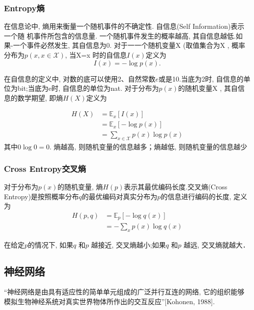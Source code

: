 \documentclass[a4paper]{article}
\begin{document}
\subsubsection{Entropy熵}
在信息论中, 熵用来衡量一个随机事件的不确定性.
 自信息(Self Information)表示一个随 机事件所包含的信息量. 一个随机事件发生的概率越高, 其自信息越低.如果-一个事件必然发生, 其自信息为0.
 对于一一个随机变量X (取值集合为X , 概率分布为$p(x,  x \in \mathcal{X})$, 当X=x
 时的自信息$I(x)$定义为
 \begin{equation}
      I(x)=- \log p(x).
 \end{equation} 
 
 在自信息的定义中, 对数的底可以使用2、自然常数$e$或是10.当底为2时, 自信息的单位为bit;当底为e时, 自信息的单位为nat.
 对于分布为$p(x)$的随机变量X , 其自信息的数学期望, 即熵$H(X)$定义为
 
 \begin{equation}
    \begin{split}
 H(X) &= \mathbb{E}_x\left[  I(x)\right] \\
 &= \mathbb{E}_x \left[  -\log p(x) \right] \\
 &=\sum_{x \in \mathcal{X}}p(x) \log p(x)    
\end{split}
 \end{equation}
 其中$ 0 \log 0= 0 $.
 熵越高, 则随机变量的信息越多；熵越低, 则随机变量的信息越少

\subsubsection{Cross Entropy交叉熵}
对于分布为$p(x)$的随机变量, 熵$H(p)$表示其最优编码长度.交叉熵(Cross Entropy)是按照概率分布$q$的最优编码对真实分布为$p$的信息进行编码的长度, 定义为 
\begin{equation}
 \begin{split}
        H(p, q)&= \mathbb{E}_p \left[ -\log q(x) \right]  \\
        &= - \sum_x p(x) \log q(x) 
 \end{split}
\end{equation}
 
在给定$p$的情况下, 如果$q$ 和$p$ 越接近, 交叉熵越小;如果$q$ 和$p$ 越远, 交叉熵就越大．


\subsection{神经网络}
“神经网络是由具有适应性的简单单元组成的广泛并行互连的网络, 它的组织能够模拟生物神经系统对真实世界物体所作出的交互反应”[Kohonen,  1988].
\end{document}

